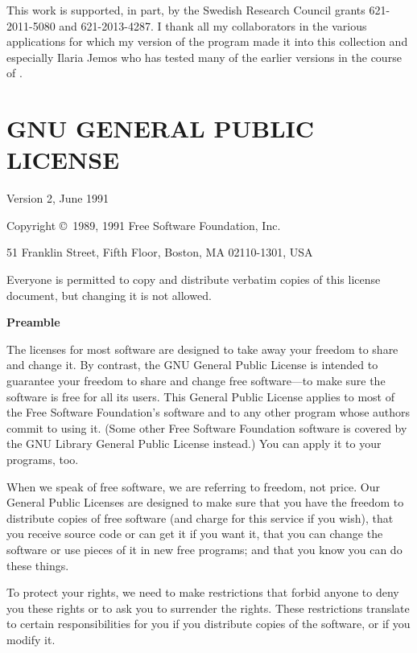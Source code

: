 \documentclass[12pt,a4paper]{article}
\begin{document}
This work is supported, in part, by
the Swedish Research Council grants 621-2011-5080 and 621-2013-4287.
I thank all my collaborators in the various applications for which my version
of the program made it into this collection and especially
Ilaria Jemos who has tested many of the earlier versions
in the course of \cite{Bijnens:2011tb}.

\appendix
\section{GNU GENERAL PUBLIC LICENSE}
\label{appGPL}
{Version 2, June 1991}


\begin{center}
{\parindent 0in

Copyright \copyright\ 1989, 1991 Free Software Foundation, Inc.

\bigskip

51 Franklin Street, Fifth Floor, Boston, MA  02110-1301, USA

\bigskip

Everyone is permitted to copy and distribute verbatim copies
of this license document, but changing it is not allowed.
}
\end{center}

\begin{center}
{\bf\large Preamble}
\end{center}


The licenses for most software are designed to take away your freedom to
share and change it.  By contrast, the GNU General Public License is
intended to guarantee your freedom to share and change free software---to
make sure the software is free for all its users.  This General Public
License applies to most of the Free Software Foundation's software and to
any other program whose authors commit to using it.  (Some other Free
Software Foundation software is covered by the GNU Library General Public
License instead.)  You can apply it to your programs, too.

When we speak of free software, we are referring to freedom, not price.
Our General Public Licenses are designed to make sure that you have the
freedom to distribute copies of free software (and charge for this service
if you wish), that you receive source code or can get it if you want it,
that you can change the software or use pieces of it in new free programs;
and that you know you can do these things.

To protect your rights, we need to make restrictions that forbid anyone to
deny you these rights or to ask you to surrender the rights.  These
restrictions translate to certain responsibilities for you if you
distribute copies of the software, or if you modify it.
\end{document}
